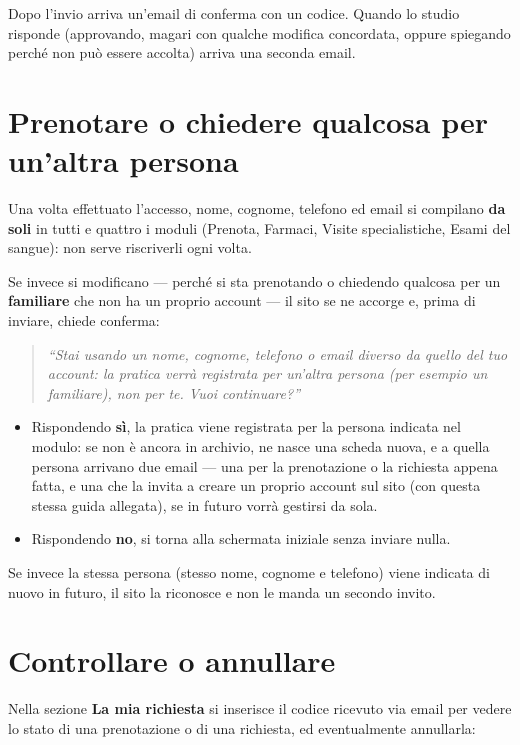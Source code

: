 \documentclass[11pt,a4paper]{article}
\newcommand{\schermata}[1]{\textbf{\color{studioteal}#1}}
\begin{document}
Dopo l'invio arriva un'email di conferma con un codice. Quando lo studio risponde (approvando, magari con qualche modifica concordata, oppure spiegando perché non può essere accolta) arriva una seconda email.

\section{Prenotare o chiedere qualcosa per un'altra persona}

Una volta effettuato l'accesso, nome, cognome, telefono ed email si compilano \textbf{da soli} in tutti e quattro i moduli (Prenota, Farmaci, Visite specialistiche, Esami del sangue): non serve riscriverli ogni volta.

Se invece si modificano --- perché si sta prenotando o chiedendo qualcosa per un \textbf{familiare} che non ha un proprio account --- il sito se ne accorge e, prima di inviare, chiede conferma:

\begin{quote}
\itshape ``Stai usando un nome, cognome, telefono o email diverso da quello del tuo account: la pratica verrà registrata per un'altra persona (per esempio un familiare), non per te. Vuoi continuare?''
\end{quote}

\begin{itemize}
  \item Rispondendo \textbf{sì}, la pratica viene registrata per la persona indicata nel modulo: se non è ancora in archivio, ne nasce una scheda nuova, e a quella persona arrivano due email --- una per la prenotazione o la richiesta appena fatta, e una che la invita a creare un proprio account sul sito (con questa stessa guida allegata), se in futuro vorrà gestirsi da sola.
  \item Rispondendo \textbf{no}, si torna alla schermata iniziale senza inviare nulla.
\end{itemize}

Se invece la stessa persona (stesso nome, cognome e telefono) viene indicata di nuovo in futuro, il sito la riconosce e non le manda un secondo invito.

\section{Controllare o annullare}

Nella sezione \schermata{La mia richiesta} si inserisce il codice ricevuto via email per vedere lo stato di una prenotazione o di una richiesta, ed eventualmente annullarla:
\end{document}
